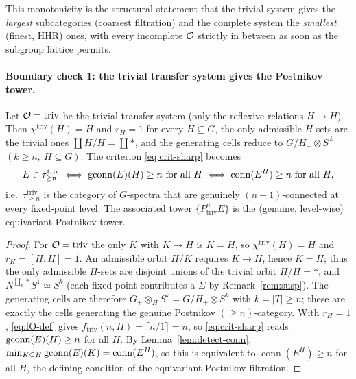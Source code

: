 This monotonicity is the structural statement that the trivial system gives the
\emph{largest} subcategories (coarsest filtration) and the complete system the
\emph{smallest} (finest, HHR) ones, with every incomplete $\qfiveaO$ strictly in
between as soon as the subgroup lattice permits.

\paragraph{Boundary check 1: the trivial transfer system gives the Postnikov tower.}

\begin{qfiveproposition}[trivial $\qfiveaO$ $=$ Postnikov]\label{prop:bd-triv}
Let $\mathcal{O}=\mathrm{triv}$ be the trivial transfer system (only the reflexive
relations $H\to H$). Then $\chi^{\mathrm{triv}}(H)=H$ and $r_H=1$ for every
$H\subseteq G$, the only admissible $H$-sets are the trivial ones $\coprod
H/H=\coprod\ast$, and the generating cells reduce to
$G/H_+\otimes S^{\,k}$ $(k\ge n,\ H\subseteq G)$. The criterion
\eqref{eq:crit-sharp} becomes
\[
E\in\tau^{\mathrm{triv}}_{\ge n}\iff \operatorname{gconn}(E)(H)\ge n\ \text{for all }H
\iff \operatorname{conn}(E^H)\ge n\ \text{for all }H,
\]
i.e.\ $\tau^{\mathrm{triv}}_{\ge n}$ is the category of $G$-spectra that are
genuinely $(n-1)$-connected at every fixed-point level. The associated tower
$\{P^n_{\mathrm{triv}}E\}$ is the (genuine, level-wise) equivariant Postnikov
tower.
\end{qfiveproposition}

\begin{proof}
For $\mathcal{O}=\mathrm{triv}$ the only $K$ with $K\to H$ is $K=H$, so
$\chi^{\mathrm{triv}}(H)=H$ and $r_H=[H:H]=1$. An admissible orbit $H/K$ requires
$K\to H$, hence $K=H$; thus the only admissible $H$-sets are disjoint unions of
the trivial orbit $H/H=\ast$, and $N^{\coprod_{k}\ast}S^1\simeq S^{k}$ (each
fixed point contributes a $\Sigma$ by Remark~\ref{rem:susp}). The generating
cells are therefore $G_+\otimes_H S^{k}=G/H_+\otimes S^{k}$ with $k=|T|\ge n$;
these are exactly the cells generating the genuine Postnikov $(\ge n)$-category.
With $r_H=1$, \eqref{eq:fO-def} gives $f_{\mathrm{triv}}(n,H)=\lceil
n/1\rceil=n$, so \eqref{eq:crit-sharp} reads $\operatorname{gconn}(E)(H)\ge n$ for all
$H$. By Lemma~\ref{lem:detect-conn}, $\min_{K\subseteq H}\operatorname{gconn}(E)(K)=
\operatorname{conn}(E^H)$, so this is equivalent to $\operatorname{conn}(E^H)\ge
n$ for all $H$, the defining condition of the equivariant Postnikov filtration.
\end{proof}

